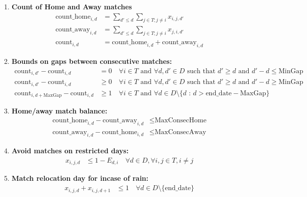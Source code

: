 \documentclass[a4paper, 12pt]{article}
\begin{document}
\begin{enumerate}
    \item \textbf{Count of Home and Away matches}
    \begin{align*}
        \text{count\_home}_{i,d} &= \sum_{d' \leq d} \sum_{j \in T; j \neq i} x_{i,j,d'} \\
        \text{count\_away}_{i,d} &= \sum_{d' \leq d} \sum_{j \in T; j \neq i} x_{j,i,d'} \\
        \text{count}_{i,d} &= \text{count\_home}_{i,d} + \text{count\_away}_{i,d}
    \end{align*}


    \item \textbf{Bounds on gaps between consecutive matches:}
    \begin{align*}
        \text{count}_{i,d'} - \text{count}_{i,d} &= 0 \quad \forall i \in T \text{ and } \forall d, d' \in D \text{ such that $d' \geq d$ and $d' - d \leq \text{MinGap}$} \\
        \text{count}_{i,d'} - \text{count}_{i,d} &\geq 0 \quad \forall i \in T \text{ and } \forall d, d' \in D \text{ such that $d' \geq d$ and $d' - d \geq \text{MinGap}$} \\
        \text{count}_{i,d+\text{MaxGap}} - \text{count}_{i,d} &\geq 1 \quad \forall i \in T \text{ and } \forall d \in D \setminus \{d \text{ : } d > \text{end\_date} - \text{MaxGap} \} 
    \end{align*}

    \item \textbf{Home/away match balance:}
    \begin{align*}
        \text{count\_home}_{i,d} - \text{count\_away}_{i,d} &\leq \text{MaxConsecHome} \\
        \text{count\_away}_{i,d} - \text{count\_home}_{i,d} &\leq \text{MaxConsecAway}
    \end{align*}

    \item \textbf{Avoid matches on restricted days:}
    \begin{align*}
        x_{i,j,d} &\leq 1 - E_{d,i} \quad \forall d \in D, \forall i,j \in T, i \neq j
    \end{align*}

    \item \textbf{Match relocation day for incase of rain:}
    \begin{align*}
        x_{i,j,d} + x_{i,j,d+1} &\leq 1 \quad \forall d \in D \setminus \{ \text{end\_date} \}
    \end{align*}


\end{enumerate}
\end{document}
